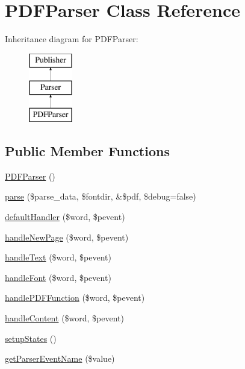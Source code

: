 \hypertarget{class_p_d_f_parser}{\section{\-P\-D\-F\-Parser \-Class \-Reference}
\label{class_p_d_f_parser}
}
\-Inheritance diagram for \-P\-D\-F\-Parser\-:\begin{figure}[H]
\begin{center}
\leavevmode
\includegraphics[height=3.000000cm]{class_p_d_f_parser}
\end{center}
\end{figure}
\subsection*{\-Public \-Member \-Functions}
\begin{DoxyCompactItemize}
\item 
\hyperlink{class_p_d_f_parser_ae0fcb585e11a6ac55ccd400e8ac59b66}{\-P\-D\-F\-Parser} ()
\item 
\hyperlink{class_p_d_f_parser_afdebe29038ca472f726d00f6f3b75403}{parse} (\$parse\-\_\-data, \$fontdir, \&\$pdf, \$debug=false)
\item 
\hyperlink{class_p_d_f_parser_a4d5d6de1bd28d678fdca6e4d5e0076b0}{default\-Handler} (\$word, \$pevent)
\item 
\hyperlink{class_p_d_f_parser_ad3a98ba296d8830bdc01c33dd66ddb56}{handle\-New\-Page} (\$word, \$pevent)
\item 
\hyperlink{class_p_d_f_parser_a7073ba7c2860a6243439f0bc465cd501}{handle\-Text} (\$word, \$pevent)
\item 
\hyperlink{class_p_d_f_parser_ae166fed7242eb96d8af55dac47d08d1c}{handle\-Font} (\$word, \$pevent)
\item 
\hyperlink{class_p_d_f_parser_a56b0deed1b246a7c1aedaba90389846f}{handle\-P\-D\-F\-Function} (\$word, \$pevent)
\item 
\hyperlink{class_p_d_f_parser_a4ad7b667ad443261db90739f55f1c682}{handle\-Content} (\$word, \$pevent)
\item 
\hyperlink{class_p_d_f_parser_abe4d21ebe5f9d4088e7be4271603cd5e}{setup\-States} ()
\item 
\hyperlink{class_p_d_f_parser_a9cc8a14f4bce21f0058f33036a2eb460}{get\-Parser\-Event\-Name} (\$value)
\end{DoxyCompactItemize}
